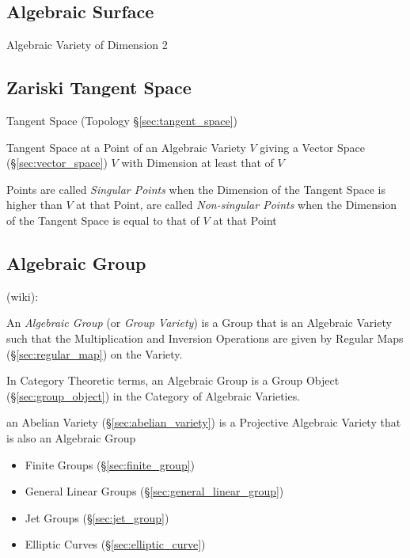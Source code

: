 \subsection{Algebraic Surface}\label{sec:algebraic_surface}

Algebraic Variety of Dimension 2



\subsection{Zariski Tangent Space}\label{sec:zariski_space}

Tangent Space (Topology \S\ref{sec:tangent_space})

Tangent Space at a Point of an Algebraic Variety $V$ giving a Vector Space
(\S\ref{sec:vector_space}) $V$ with Dimension at least that of $V$

Points are called \emph{Singular Points} when the Dimension of the Tangent
Space is higher than $V$ at that Point, are called \emph{Non-singular Points}
when the Dimension of the Tangent Space is equal to that of $V$ at that Point



\subsection{Algebraic Group}\label{sec:algebraic_group}

(wiki):

An \emph{Algebraic Group} (or \emph{Group Variety}) is a Group that is an
Algebraic Variety such that the Multiplication and Inversion Operations are
given by Regular Maps (\S\ref{sec:regular_map}) on the Variety.

In Category Theoretic terms, an Algebraic Group is a Group Object
(\S\ref{sec:group_object}) in the Category of Algebraic Varieties.

an Abelian Variety (\S\ref{sec:abelian_variety}) is a Projective Algebraic
Variety that is also an Algebraic Group

\begin{itemize}
  \item Finite Groups (\S\ref{sec:finite_group})
  \item General Linear Groups (\S\ref{sec:general_linear_group})
  \item Jet Groups (\S\ref{sec:jet_group})
  \item Elliptic Curves (\S\ref{sec:elliptic_curve})
\end{itemize}



